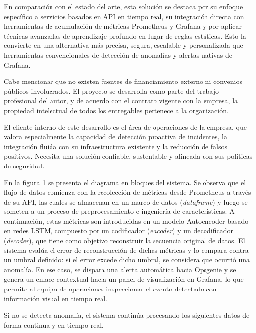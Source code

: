 \documentclass[
11pt, %
]{charter}
\begin{document}
En comparación con el estado del arte, esta solución se destaca por su enfoque específico a servicios basados en API en tiempo real, su integración directa con herramientas de acumulación de métricas Prometheus y Grafana y por aplicar técnicas avanzadas de aprendizaje profundo en lugar de reglas estáticas. Esto la convierte en una alternativa más precisa, segura, escalable y personalizada que herramientas convencionales de detección de anomalías y alertas nativas de Grafana.

Cabe mencionar que no existen fuentes de financiamiento externo ni convenios públicos involucrados. El proyecto se desarrolla como parte del trabajo profesional del autor, y de acuerdo con el contrato vigente con la empresa, la propiedad intelectual de todos los entregables pertenece a la organización.

El cliente interno de este desarrollo es el área de operaciones de la empresa, que valora especialmente la capacidad de detección proactiva de incidentes, la integración fluida con su infraestructura existente y la reducción de falsos positivos. Necesita una solución confiable, sustentable y alineada con sus políticas de seguridad.

En la figura 1 se presenta el diagrama en bloques del sistema. Se observa que el flujo de datos comienza con la recolección de métricas desde Prometheus a través de su API, las cuales se almacenan en un marco de datos (\textit{dataframe}) y luego se someten a un proceso de preprocesamiento e ingeniería de características. A continuación, estas métricas son introducidas en un modelo Autoencoder basado en redes LSTM, compuesto por un codificador (\textit{encoder}) y un decodificador (\textit{decoder}), que tiene como objetivo reconstruir la secuencia original de datos. El sistema evalúa el error de reconstrucción de dichas métricas y lo compara contra un umbral definido: si el error excede dicho umbral, se considera que ocurrió una anomalía. En ese caso, se dispara una alerta automática hacia Opsgenie y se genera un enlace contextual hacia un panel de visualización en Grafana, lo que permite al equipo de operaciones inspeccionar el evento detectado con información visual en tiempo real. 

Si no se detecta anomalía, el sistema continúa procesando los siguientes datos de forma continua y en tiempo real. 

 
\end{document}
